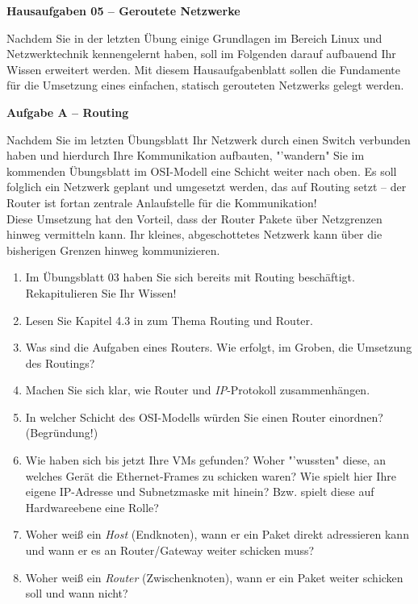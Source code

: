 \documentclass[paper=a4,fontsize=11pt]{scrartcl}%
\numberwithin{equation}{section}
\begin{document}
\begin{center}
\Large{\textbf{Hausaufgaben 05 -- Geroutete Netzwerke}}\\
\end{center}
Nachdem Sie in der letzten Übung einige Grundlagen im Bereich Linux und Netzwerktechnik kennengelernt haben, soll im Folgenden darauf aufbauend Ihr Wissen erweitert werden. Mit diesem Hausaufgabenblatt sollen die Fundamente für die Umsetzung eines einfachen, statisch gerouteten Netzwerks gelegt werden.

\begin{center}
\Large{\textbf{Aufgabe A -- Routing}}
\end{center}
\vskip0.25in
Nachdem Sie im letzten Übungsblatt Ihr Netzwerk durch einen Switch verbunden haben und hierdurch Ihre Kommunikation aufbauten, "'wandern" Sie im kommenden Übungsblatt im OSI-Modell eine Schicht weiter nach oben. Es soll folglich ein Netzwerk geplant und umgesetzt werden, das auf Routing setzt -- der Router ist fortan zentrale Anlaufstelle für die Kommunikation!\\
Diese Umsetzung hat den Vorteil, dass der Router Pakete über Netzgrenzen hinweg vermitteln kann. Ihr kleines, abgeschottetes Netzwerk kann über die bisherigen Grenzen hinweg kommunizieren.
\begin{enumerate}
	\item Im Übungsblatt 03 haben Sie sich bereits mit Routing beschäftigt. Rekapitulieren Sie Ihr Wissen!
	\item Lesen Sie Kapitel 4.3 in \cite[S. 320ff]{Kurose2012} zum Thema Routing und Router.
	\item Was sind die Aufgaben eines Routers. Wie erfolgt, im Groben, die Umsetzung des Routings?
	\item Machen Sie sich klar, wie Router und \emph{IP}-Protokoll zusammenhängen.
	\item In welcher Schicht des OSI-Modells würden Sie einen Router einordnen? (Begründung!)
	\item Wie haben sich bis jetzt Ihre VMs gefunden? Woher "'wussten" diese, an welches Gerät die Ethernet-Frames zu schicken waren? Wie spielt hier Ihre eigene IP-Adresse und Subnetzmaske mit hinein? Bzw. spielt diese auf Hardwareebene eine Rolle?
	\item Woher weiß ein \textit{Host} (Endknoten), wann er ein Paket direkt adressieren kann und wann er es an Router/Gateway weiter schicken muss?
	\item Woher weiß ein \textit{Router} (Zwischenknoten), wann er ein Paket weiter schicken soll und wann nicht?
\end{enumerate}
\end{document}
